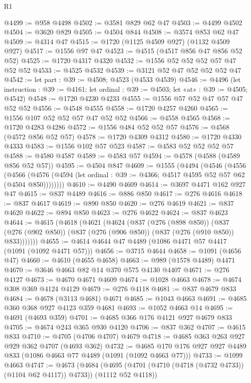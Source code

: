 \begin{lexlean}{R1}
\begin{coremodule}
@4499 := @958 @4498
@4502 := @3581 @829 @62 @47
@4503 := @4499 @4502
@4504 := @3620 @829
@4505 := @4504 @844
@4508 := @3574 @853 @62 @47
@4509 := @4314 @47
@4515 := @1720 (@1125 @4509 @927) (@1132 @4509 @927)
@4517 := @1556 @97 @47
@4523 := @4515 (@4517 @856 @47 @856 @52 @52)
@4525 := @1720 @4317 @4320
@4532 := @1556 @52 @52 @52 @57 @47 @52 @52
@4533 := @4525 @4532
@4539 := @3121 @52 @47 @52 @52 @52 @47
@4542 := let part : @39 := @4508; @4523 (@4533 @4539)
@4546 := @4496
    (let instruction : @39 := @4161; let ordinal : @39 := @4503; let «at» : @39 := @4505; @4542)
@4548 := @1720 @4230 @4233
@4555 := @1556 @57 @52 @47 @57 @47 @52 @52
@4556 := @4548 @4555
@4558 := @1720 @4257 @4260
@4565 := @1556 @107 @52 @52 @57 @47 @52 @52
@4566 := @4558 @4565
@4568 := @1720 @4283 @4286
@4572 := @1556 @484 @52 @52 @57
@4576 := @4568 (@4572 @856 @52 @57)
@4578 := @1720 @4309 @4312
@4580 := @1720 @4330 @4333
@4583 := @1556 @102 @57 @523
@4587 := @4583 @52 @52 @52 @57
@4588 := @4580 @4587
@4589 := @4583 @57
@4594 := @4578 (@4588 (@4589 @856 @52 @57))
@4595 := @4504 @847
@4609 := @1555
    (@4494
      (@4546
        (@4556
          (@4566
            (@4576 (@4594 (let ordinal : @39 := @4366; @4517 @4595 @52 @57 @62 (@4504 @850))))))))
@4610 := @4490 @4609
@4614 := @3697 @4471 @162 @927 @47
@4615 := @837 @4489
@4616 := @886 @850
@4617 := @276 @4616
@4618 := @837 @4617
@4619 := @890 @850
@4620 := @276 @4619
@4621 := @837 @4620
@4622 := @894 @850
@4623 := @276 @4622
@4624 := @837 @4623
@4644 := @4615
    (@4618
      (@4621
        (@4624
          (@837
            (@276 (@898 @850))
            (@837 (@276 (@902 @850)) (@837 (@276 (@906 @850)) (@837 (@276 (@910 @850)) @833)))))))
@4655 := @4614 @4644 @47 @4489 (@1086 @4471 @57 @4417 (@1091 (@1092 @4471 @57)))
@4656 := @3715 @4644
@4658 := @1091 (@4656 @47)
@4660 := @4610 (@4655 @4658)
@4663 := @989 (@1578 @4489) @4471
@4670 := @3646 @4663 @82 @14 @370 @575 @4130 @4407
@4671 := @276 @4127
@4673 := @4670 @4671 @4609
@4674 := @1028 @4663
@4678 := @4674 @308 @369 @4124 @4129
@4679 := @276 @4118
@4681 := @837 @4679 @833
@4684 := @4678 (@3113 @4681) @4671
@4685 := @1043 @4663
@4691 := @4685 @360 @368 @927 @4123 @359 @4681
@4693 := @1052 @4663 @14
@4695 := @4691 (@4693 @359)
@4701 := @4685 @366 @176 @4121 @927 @4679 @833
@4705 := @4674 @243 @365 @930 @4120
@4706 := @837 @362
@4707 := @4615 @833
@4710 := @4705 (@4706 @4707) @4679
@4718 := @4685 @363 @263 @927 @929 @362 @4707 (@4693 @362)
@4732 := @4685 @170 @176 @927 @927 @4489 @833 (@1086 @4663 @77 @4489 (@1091 (@1092 @4663 @77)))
@4733 := @1099 @4663
@4747 := @4673
    (@4684 (@4695 (@4701 (@4710 (@4718 (@4732 @4733)) (@1104 @62 @4117)) @4733)) (@1112 @52 @4118))

\end{coremodule}
\end{lexlean}

